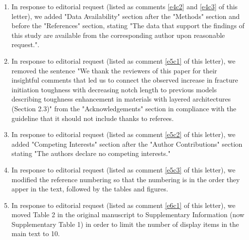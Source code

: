 \documentclass[11pt,letterpaper]{report}
\begin{document}
\begin{enumerate}[label=\textit{Ec.\arabic*}]



\item \label{Methods2} In response to editorial request (listed as comments \ref{e4c2} and \ref{e4c3} of this letter), we added "Data Availability" section after the "Methods" section and before the "References" section, stating "The data that support the findings of this study are available from the corresponding author upon reasonable request.".


\item \label{EndNote1} In response to editorial request (listed as comment \ref{e5c1} of this letter), we removed the sentence "We thank the reviewers of this paper for their insightful comments that led us to connect the observed increase in fracture initiation toughness with decreasing notch length to previous models describing toughness enhancement in materials with layered architectures (Section 2.3)" from the "Acknowledgements" section in compliance with the guideline that it should not include thanks to referees.

\item \label{EndNote2} In response to editorial request (listed as comment \ref{e5c2} of this letter), we added "Competing Interests" section after the "Author Contributions" section stating "The authors declare no competing interests."

\item \label{EndNote3} In response to editorial request (listed as comment \ref{e5c3} of this letter), we modified the reference numbering so that the numbering is in the order they apper in the text, followed by the tables and figures.


\item \label{Display1} In response to editorial request (listed as comment \ref{e6c1} of this letter), we moved Table 2 in the original manuscript to Supplementary Information (now Supplementary Table 1) in order to limit the number of display items in the main text to 10.


\end{enumerate}
\end{document}
